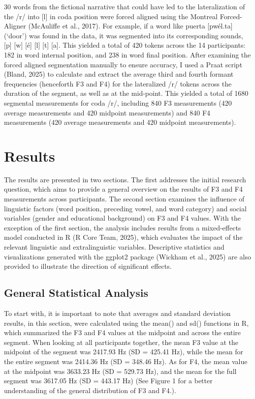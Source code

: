 \documentclass[
  man]{apa6}
\begin{document}
30 words from the fictional narrative that could have led to the lateralization of the /r/ into {[}l{]} in coda position were forced aligned using the Montreal Forced-Aligner (McAuliffe et al., 2017). For example, if a word like puerta {[}pwél.ta{]} (`door') was found in the data, it was segmented into its corresponding sounds, {[}p{]} {[}w{]} {[}é{]} {[}l{]} {[}t{]} {[}a{]}. This yielded a total of 420 tokens across the 14 participants: 182 in word internal position, and 238 in word final position. After examining the forced aligned segmentation manually to ensure accuracy, I used a Praat script (Bland, 2025) to calculate and extract the average third and fourth formant frequencies (henceforth F3 and F4) for the lateralized /r/ tokens across the duration of the segment, as well as at the mid-point. This yielded a total of 1680 segmental measurements for coda /r/, including 840 F3 measurements (420 average measurements and 420 midpoint measurements) and 840 F4 measurements (420 average measurements and 420 midpoint measurements).

\section{Results}\label{results}

The results are presented in two sections. The first addresses the initial research question, which aims to provide a general overview on the results of F3 and F4 measurements across participants. The second section examines the influence of linguistic factors (word position, preceding vowel, and word category) and social variables (gender and educational background) on F3 and F4 values.
With the exception of the first section, the analysis includes results from a mixed-effects model conducted in R (R Core Team, 2025), which evaluates the impact of the relevant linguistic and extralinguistic variables. Descriptive statistics and visualizations generated with the ggplot2 package (Wickham et al., 2025) are also provided to illustrate the direction of significant effects.

\subsection{General Statistical Analysis}\label{general-statistical-analysis}

To start with, it is important to note that averages and standard deviation results, in this section, were calculated using the mean() and sd() functions in R, which summarized the F3 and F4 values at the midpoint and across the entire segment. When looking at all participants together, the mean F3 value at the midpoint of the segment was 2417.93 Hz (SD = 425.41 Hz), while the mean for the entire segment was 2414.36 Hz (SD = 348.46 Hz). As for F4, the mean value at the midpoint was 3633.23 Hz (SD = 529.73 Hz), and the mean for the full segment was 3617.05 Hz (SD = 443.17 Hz) (See Figure 1 for a better understanding of the general distribution of F3 and F4.).
\end{document}

